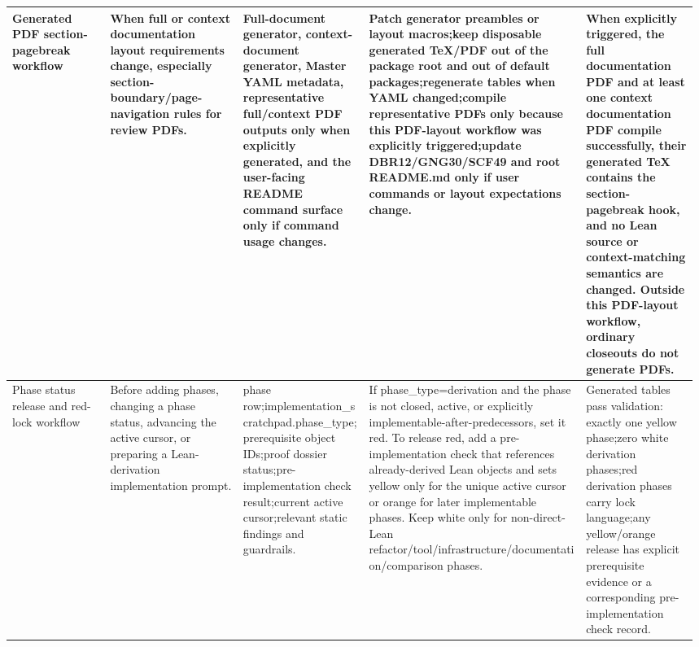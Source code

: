 \begin{longtable}{L{0.14\linewidth} L{0.19\linewidth} L{0.18\linewidth} L{0.31\linewidth} L{0.16\linewidth}}
\hline
\addlinespace[0.24em]
Generated PDF section-pagebreak workflow & When full or context documentation layout requirements change, especially section-boundary/\allowbreak{}page-navigation rules for review PDFs. & Full-document generator, context-document generator, Master YAML metadata, representative full/\allowbreak{}context PDF outputs only when explicitly generated, and the user-facing README command surface only if command usage changes. & Patch generator preambles or layout macros;\newline keep disposable generated TeX/\allowbreak{}PDF out of the package root and out of default packages;\newline regenerate tables when YAML changed;\newline compile representative PDFs only because this PDF-layout workflow was explicitly triggered;\newline update DBR12/\allowbreak{}GNG30/\allowbreak{}SCF49 and root README.md only if user commands or layout expectations change. & When explicitly triggered, the full documentation PDF and at least one context documentation PDF compile successfully, their generated TeX contains the section-pagebreak hook, and no Lean source or context-matching semantics are changed. Outside this PDF-layout workflow, ordinary closeouts do not generate PDFs.\\
\hline
\addlinespace[0.24em]
Phase status release and red-lock workflow & Before adding phases, changing a phase status, advancing the active cursor, or preparing a Lean-derivation implementation prompt. & phase row;\newline implementation\_scratchpad.phase\_type;\newline prerequisite object IDs;\newline proof dossier status;\newline pre-implementation check result;\newline current active cursor;\newline relevant static findings and guardrails. & If phase\_type=derivation and the phase is not closed, active, or explicitly implementable-after-predecessors, set it red. To release red, add a pre-implementation check that references already-derived Lean objects and sets yellow only for the unique active cursor or orange for later implementable phases. Keep white only for non-direct-Lean refactor/\allowbreak{}tool/\allowbreak{}infrastructure/\allowbreak{}documentation/\allowbreak{}comparison phases. & Generated tables pass validation: exactly one yellow phase;\newline zero white derivation phases;\newline red derivation phases carry lock language;\newline any yellow/\allowbreak{}orange release has explicit prerequisite evidence or a corresponding pre-implementation check record.\\

\end{longtable}
